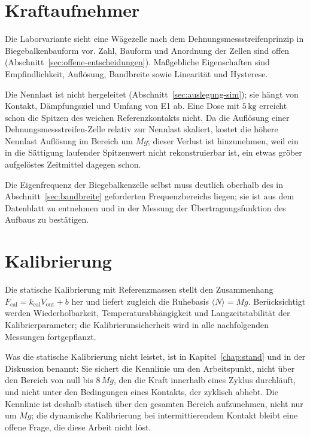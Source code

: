 \documentclass[12pt,a4paper]{report}
\begin{document}
\section{Kraftaufnehmer}

Die Laborvariante sieht eine Wägezelle nach dem
Dehnungsmessstreifenprinzip in Biegebalkenbauform vor. Zahl, Bauform und
Anordnung der Zellen sind offen
(Abschnitt~\ref{sec:offene-entscheidungen}). Maßgebliche Eigenschaften
sind Empfindlichkeit,
Auflösung, Bandbreite sowie Linearität und Hysterese.

Die Nennlast ist nicht hergeleitet (Abschnitt~\ref{sec:auslegung-sim});
sie hängt von Kontakt, Dämpfungsziel und Umfang von E1 ab. Eine Dose mit
$5\,\mathrm{kg}$ erreicht schon die Spitzen des weichen Referenzkontakts
nicht. Da die Auflösung einer
Dehnungsmessstreifen-Zelle relativ zur Nennlast skaliert, kostet die
höhere Nennlast Auflösung im Bereich um $Mg$; dieser Verlust ist
hinzunehmen, weil ein in die Sättigung laufender Spitzenwert nicht
rekonstruierbar ist, ein etwas gröber aufgelöstes Zeitmittel dagegen
schon.

Die Eigenfrequenz der Biegebalkenzelle selbst muss deutlich oberhalb
des in Abschnitt~\ref{sec:bandbreite} geforderten Frequenzbereichs
liegen; sie ist aus dem Datenblatt zu entnehmen und in der Messung der
Übertragungsfunktion des Aufbaus zu bestätigen.

\section{Kalibrierung}

Die statische Kalibrierung mit Referenzmassen stellt den Zusammenhang
$F_{\mathrm{cal}} = k_{\mathrm{cal}} V_{\mathrm{out}} + b$ her und liefert
zugleich die Ruhebasis $\langle N \rangle = Mg$. Berücksichtigt werden
Wiederholbarkeit, Temperaturabhängigkeit und Langzeitstabilität der
Kalibrierparameter; die Kalibrierunsicherheit wird in alle nachfolgenden
Messungen fortgepflanzt.

Was die statische Kalibrierung nicht leistet, ist in
Kapitel~\ref{chap:stand} und in der Diskussion benannt: Sie sichert die
Kennlinie um den Arbeitspunkt, nicht über den Bereich von null bis
$8\,Mg$, den die Kraft innerhalb eines Zyklus durchläuft, und nicht
unter den Bedingungen eines Kontakts, der zyklisch abhebt. Die
Kennlinie ist deshalb statisch über den gesamten Bereich aufzunehmen,
nicht nur um $Mg$; die dynamische Kalibrierung bei intermittierendem
Kontakt bleibt eine offene Frage, die diese Arbeit nicht löst.
\end{document}
